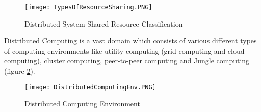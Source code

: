 \begin{figure}[ht!]
\centering
\texttt{[image: TypesOfResourceSharing.PNG]}
\caption{Distributed System Shared Resource Classification}
\label{fig:TypesOfResourceSharing}
\end{figure}
  
Distributed Computing is a vast domain which consists of various different types of computing environments like utility computing (grid computing and cloud computing), cluster computing, peer-to-peer computing and Jungle computing (figure \ref{fig:DistributedComputingEnv}). 

\begin{figure}[ht!]
\centering
\texttt{[image: DistributedComputingEnv.PNG]}
\caption{Distributed Computing Environment}
\label{fig:DistributedComputingEnv}
\end{figure}

